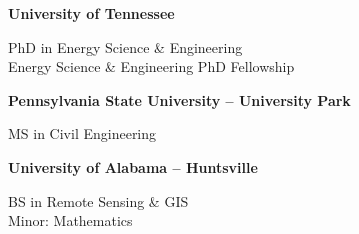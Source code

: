 \documentclass{tidycv} %
\begin{document}
\begin{cveducations}
  
    {{\bf University of Tennessee}} %
    {
    \begin{cveducationitems} %
        PhD in Energy Science \& Engineering \\
        Energy Science \& Engineering PhD Fellowship\\
	\end{cveducationitems}
    }
    
    {{\bf Pennsylvania State University -- University Park}} %
    {
    \begin{cveducationitems} %
        MS in Civil Engineering %
	\end{cveducationitems}
    }
    
    {{\bf University of Alabama -- Huntsville}} %
    {
    \begin{cveducationitems} %
        BS in Remote Sensing \& GIS \\Minor: Mathematics\\
	\end{cveducationitems}
    }    
    
    
\end{cveducations}


\end{document}

